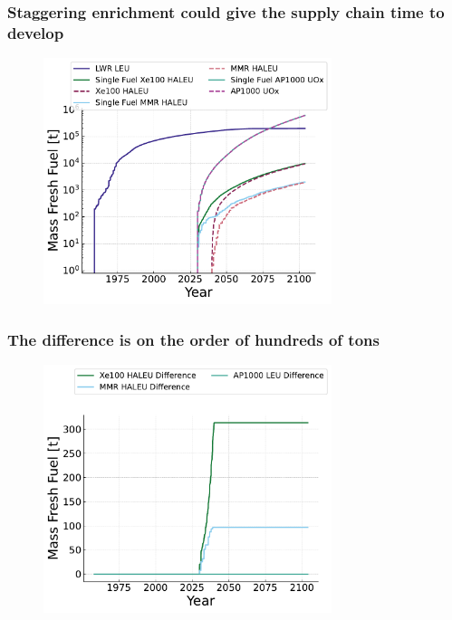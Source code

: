 \documentclass[9pt]{beamer}
\begin{document}
  \begin{frame}
    \frametitle{Staggering enrichment could give the supply chain time to develop}
    \begin{figure}
        \centering
        \includegraphics[width=0.75\textwidth]{../images/fresh_fuel.pdf}
    \end{figure}
  \end{frame}

  \begin{frame}
    \frametitle{The difference is on the order of hundreds of tons}
    \begin{figure}
        \centering
        \includegraphics[width=0.75\textwidth]{../images/fresh_fuel_difference.pdf}
    \end{figure}
  \end{frame}
\end{document}
